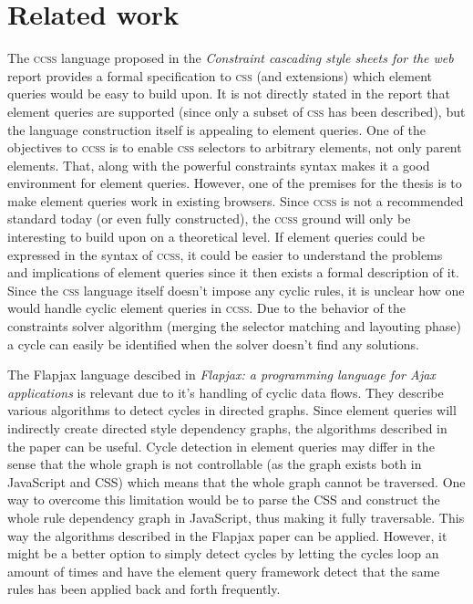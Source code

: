 \documentclass[oneside,a4paper,11pt]{kth-mag}
\begin{document}
\section*{Related work}
The \textsc{ccss} language proposed in the \emph{Constraint cascading style sheets for the web} report provides a formal specification to \textsc{css} (and extensions) which element queries would be easy to build upon.
It is not directly stated in the report that element queries are supported (since only a subset of \textsc{css} has been described), but the language construction itself is appealing to element queries.
One of the objectives to \textsc{ccss} is to enable \textsc{css} selectors to arbitrary elements, not only parent elements.
That, along with the powerful constraints syntax makes it a good environment for element queries.
However, one of the premises for the thesis is to make element queries work in existing browsers.
Since \textsc{ccss} is not a recommended standard today (or even fully constructed), the \textsc{ccss} ground will only be interesting to build upon on a theoretical level.
If element queries could be expressed in the syntax of \textsc{ccss}, it could be easier to understand the problems and implications of element queries since it then exists a formal description of it.
Since the \textsc{css} language itself doesn't impose any cyclic rules, it is unclear how one would handle cyclic element queries in \textsc{ccss}.
Due to the behavior of the constraints solver algorithm (merging the selector matching and layouting phase) a cycle can easily be identified when the solver doesn't find any solutions.

The Flapjax language descibed in \emph{Flapjax: a programming language for Ajax applications} is relevant due to it's handling of cyclic data flows.
They describe various algorithms to detect cycles in directed graphs.
Since element queries will indirectly create directed style dependency graphs, the algorithms described in the paper can be useful.
Cycle detection in element queries may differ in the sense that the whole graph is not controllable (as the graph exists both in JavaScript and CSS) which means that the whole graph cannot be traversed.
One way to overcome this limitation would be to parse the CSS and construct the whole rule dependency graph in JavaScript, thus making it fully traversable.
This way the algorithms described in the Flapjax paper can be applied.
However, it might be a better option to simply detect cycles by letting the cycles loop an amount of times and have the element query framework detect that the same rules has been applied back and forth frequently.
\end{document}
